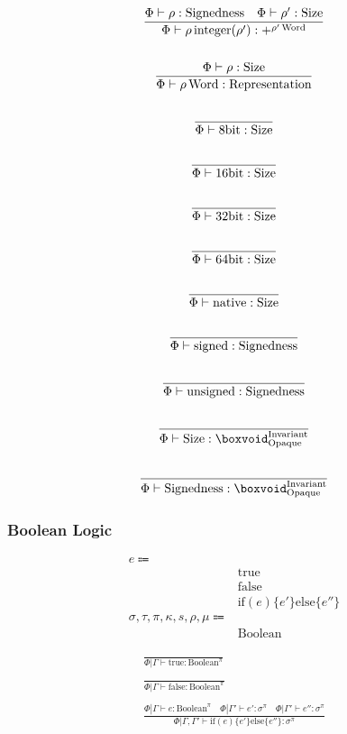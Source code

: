 \documentclass {article}
\begin{document}
\begin{gather*}
\frac
{\Phi \vdash \rho : \text{Signedness} \quad \Phi \vdash \rho' : \text{Size}}
{\Phi \vdash \rho \, \text{integer}(\rho') : +^ {\rho' \, \text{Word}} } \\
\\
\frac
{\Phi \vdash \rho : \text{Size}}
{\Phi \vdash \rho \, \text{Word} : \text{Representation}} \\
\\
\frac
{}
{\Phi \vdash 8\text{bit} : \text{Size}} \\
\\
\frac
{}
{\Phi \vdash 16\text{bit} : \text{Size}} \\
\\
\frac
{}
{\Phi \vdash 32\text{bit} : \text{Size}} \\
\\
\frac
{}
{\Phi \vdash 64\text{bit} : \text{Size}} \\
\\
\frac
{}
{\Phi \vdash \text{native} : \text{Size}} \\
\\
\frac
{}
{\Phi \vdash \text{signed} : \text{Signedness}} \\
\\
\frac
{}
{\Phi \vdash \text{unsigned} : \text{Signedness}} \\
\\
\frac
{}
{\Phi \vdash \text{Size} : \boxvoid^\text{Invariant}_\text{Opaque}} \\
\\
\frac
{}
{\Phi \vdash \text{Signedness} : \boxvoid^\text{Invariant}_\text{Opaque}}
\end{gather*}

\subsubsection{Boolean Logic}
\begin{align*}
e \Coloneqq & \\
& \text{true} \\
& \text{false} \\
& \text{if} (e) \{ e' \} \text{else} \{ e'' \} \\
\sigma, \tau, \pi, \kappa, s, \rho, \mu \Coloneqq & \\
& \text{Boolean}
\end{align*}

\begin{gather*}
\frac
{}
{ \Phi | \Gamma \vdash \text{true} : \text{Boolean}^\pi} \\
\\
\frac
{}
{ \Phi | \Gamma \vdash \text{false} : \text{Boolean}^\pi} \\
\\
\frac
{\Phi | \Gamma \vdash e : \text{Boolean}^\pi \quad \Phi | \Gamma' \vdash e' : \sigma^\pi \quad \Phi | \Gamma' \vdash e'' : \sigma^\pi }
{\Phi | \Gamma, \Gamma' \vdash \text{if} (e) \{ e' \} \text{else} \{ e'' \} : \sigma^\pi }
\end{gather*}
\end{document}

